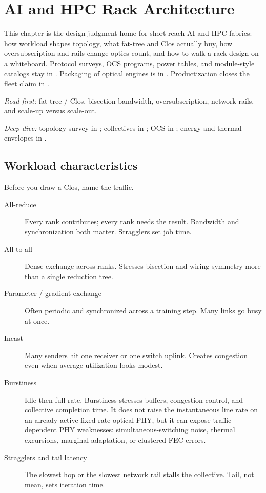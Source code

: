 \chapter{AI and HPC Rack Architecture}
\label{ch:hpc}
\label{sec:hpc-rack}

This chapter is the design judgment home for short-reach AI and HPC fabrics:
how workload shapes topology, what fat-tree and Clos actually buy, how
oversubscription and rails change optics count, and how to walk a rack design
on a whiteboard. Protocol surveys, OCS programs, power tables, and module-style
catalogs stay in . Packaging of optical engines is
in . Productization closes the fleet claim in
.

\textit{Read first:} fat-tree / Clos, bisection bandwidth, oversubscription,
network rails, and scale-up versus scale-out.

\textit{Deep dive:} topology survey in ; collectives in
; OCS in ; energy and thermal envelopes in
.


\section{Workload characteristics}
\label{sec:hpc-workload}

Before you draw a Clos, name the traffic.

\begin{description}
\item[All-reduce] Every rank contributes; every rank needs the result.
      Bandwidth and synchronization both matter. Stragglers set job time.
\item[All-to-all] Dense exchange across ranks. Stresses bisection and wiring
      symmetry more than a single reduction tree.
\item[Parameter / gradient exchange] Often periodic and synchronized across
      a training step. Many links go busy at once.
\item[Incast] Many senders hit one receiver or one switch uplink. Creates
      congestion even when average utilization looks modest.
\item[Burstiness] Idle then full-rate. Burstiness stresses buffers, congestion
      control, and collective completion time. It does not raise the
      instantaneous line rate on an already-active fixed-rate optical PHY, but
      it can expose traffic-dependent PHY weaknesses: simultaneous-switching
      noise, thermal excursions, marginal adaptation, or clustered FEC errors.
\item[Stragglers and tail latency] The slowest hop or the slowest network rail
      stalls the collective. Tail, not mean, sets iteration time.
\end{description}


